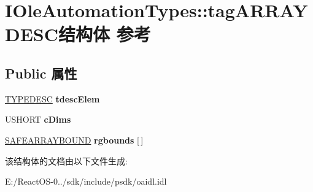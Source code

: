 \hypertarget{struct_i_ole_automation_types_1_1tag_a_r_r_a_y_d_e_s_c}{}\section{I\+Ole\+Automation\+Types\+:\+:tag\+A\+R\+R\+A\+Y\+D\+E\+S\+C结构体 参考}
\label{struct_i_ole_automation_types_1_1tag_a_r_r_a_y_d_e_s_c}
\subsection*{Public 属性}
\begin{DoxyCompactItemize}
\item 
\mbox{\label{struct_i_ole_automation_types_1_1tag_a_r_r_a_y_d_e_s_c_a42d7e617521a58ab10f3a2a8e40fd311}} 
\hyperlink{struct_i_ole_automation_types_1_1tag_t_y_p_e_d_e_s_c}{T\+Y\+P\+E\+D\+E\+SC} {\bfseries tdesc\+Elem}
\item 
\mbox{\label{struct_i_ole_automation_types_1_1tag_a_r_r_a_y_d_e_s_c_a0a23732b33885c9b4c64d38375678ec3}} 
U\+S\+H\+O\+RT {\bfseries c\+Dims}
\item 
\mbox{\label{struct_i_ole_automation_types_1_1tag_a_r_r_a_y_d_e_s_c_a4d7953bbf5d73ca70aec23c8f4da1e94}} 
\hyperlink{struct_i_ole_automation_types_1_1tag_s_a_f_e_a_r_r_a_y_b_o_u_n_d}{S\+A\+F\+E\+A\+R\+R\+A\+Y\+B\+O\+U\+ND} {\bfseries rgbounds} \mbox{[}$\,$\mbox{]}
\end{DoxyCompactItemize}


该结构体的文档由以下文件生成\+:\begin{DoxyCompactItemize}
\item 
E\+:/\+React\+O\+S-\/0../sdk/include/psdk/oaidl.\+idl\end{DoxyCompactItemize}
